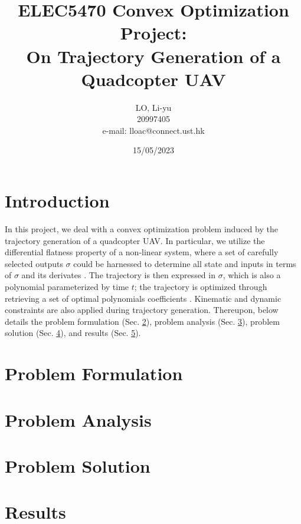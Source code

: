 \documentclass[a4paper,10.5pt]{article}
\begin{document}
%
   \title{\textbf{ELEC5470 Convex Optimization Project}:  \\
   On Trajectory Generation of a Quadcopter UAV}
      
   \author{LO, Li-yu \\ 20997405 \\ e-mail: lloac@connect.ust.hk}
          
   \date{15/05/2023}

   \maketitle

   
\section{Introduction}
   In this project, we deal with a convex optimization problem
   induced by the trajectory generation of a quadcopter UAV.
   In particular, we utilize the differential flatness property of a 
   non-linear system, where a set of carefully selected outputs $\sigma$ could be
   harnessed to determine all state and inputs in terms of $\sigma$ and its derivates
   \cite{van1998real}.
   The trajectory is then expressed in $\sigma$, which is also a polynomial 
   parameterized by time $t$;
   the trajectory is optimized through retrieving a set of
   optimal polynomials coefficients \cite{mellinger2011minimum}. 
   Kinematic and dynamic constraints are also applied during trajectory generation.
   Thereupon, below details 
   the problem formulation (Sec. \hyperref[sec:PF]{2}), 
   problem analysis (Sec. \hyperref[sec:PA]{3}),
   problem solution (Sec. \hyperref[sec:PS]{4}),
   and results (Sec. \hyperref[sec:Re]{5}).

\section{Problem Formulation}
\label{sec:PF}

\section{Problem Analysis}
\label{sec:PA}

\section{Problem Solution}
\label{sec:PS}

\section{Results}
\label{sec:Re}







\end{document}
